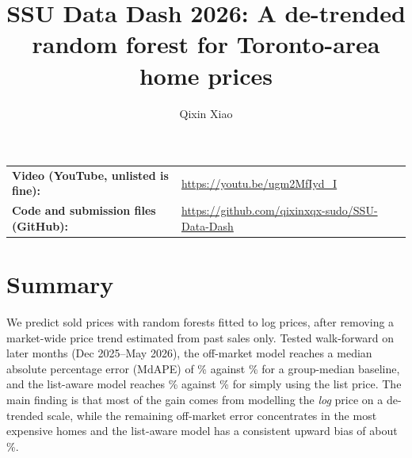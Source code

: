 \documentclass[11pt]{article}
\title{SSU Data Dash 2026: A de-trended random forest for Toronto-area home prices}
\author{Qixin Xiao}
\date{}
\begin{document}
\maketitle

\noindent\begin{tabular}{@{}ll}
\textbf{Video (YouTube, unlisted is fine):} & \url{https://youtu.be/ugm2MfIyd_I} \\
\textbf{Code and submission files (GitHub):} & \url{https://github.com/qixinxqx-sudo/SSU-Data-Dash} \\
\end{tabular}

\section*{Summary}
We predict sold prices with random forests fitted to log prices, after removing a market-wide price trend estimated from past sales only. Tested walk-forward on later months (Dec 2025--May 2026), the off-market model reaches a median absolute percentage error (MdAPE) of \offMdAPE\% against \offBaseMdAPE\% for a group-median baseline, and the list-aware model reaches \laMdAPE\% against \laBaseMdAPE\% for simply using the list price. The main finding is that most of the gain comes from modelling the \emph{log} price on a de-trended scale, while the remaining off-market error concentrates in the most expensive homes and the list-aware model has a consistent upward bias of about \laBiasPct\%.
\end{document}
